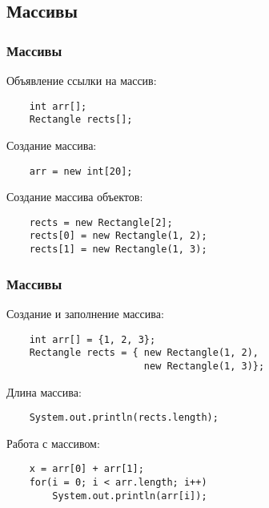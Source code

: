 \subsection{Массивы}
\begin{frame}[fragile]
	\frametitle{Массивы}

	\begin{Large}
	Объявление ссылки на массив:
	\begin{verbatim}
	int arr[];
	Rectangle rects[];
	\end{verbatim}

	Создание массива:
	\begin{verbatim}
	arr = new int[20];
	\end{verbatim}

	Создание массива объектов:
	\begin{verbatim}
	rects = new Rectangle[2];
	rects[0] = new Rectangle(1, 2);
	rects[1] = new Rectangle(1, 3);
	\end{verbatim}
	\end{Large}
\end{frame}

\begin{frame}[fragile]
	\frametitle{Массивы}

	\begin{Large}
	Создание и заполнение массива:
	\begin{verbatim}
	int arr[] = {1, 2, 3};
	Rectangle rects = { new Rectangle(1, 2),
	                    new Rectangle(1, 3)};
	\end{verbatim}

	Длина массива:
	\begin{verbatim}
	System.out.println(rects.length);
	\end{verbatim}

	Работа с массивом:
	\begin{verbatim}
	x = arr[0] + arr[1];
	for(i = 0; i < arr.length; i++)
	    System.out.println(arr[i]);
	\end{verbatim}

	\end{Large}
\end{frame}
